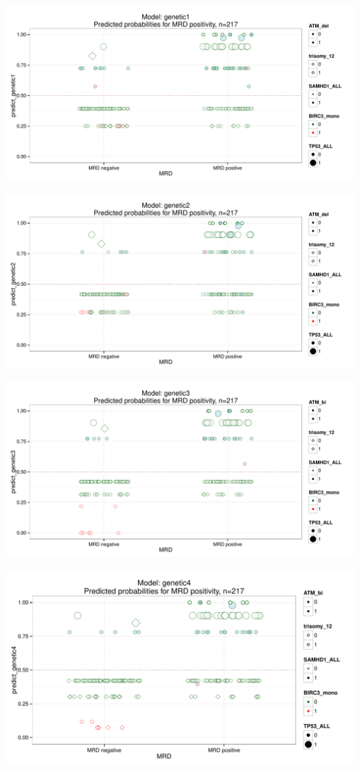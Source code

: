 \documentclass[a4paper,11pt]{article}
\begin{document}
\includegraphics{HICF1_Finalreportv6-genetic1}

\includegraphics{HICF1_Finalreportv6-genetic2}

\includegraphics{HICF1_Finalreportv6-genetic3}

\includegraphics{HICF1_Finalreportv6-genetic4}
\end{document}
